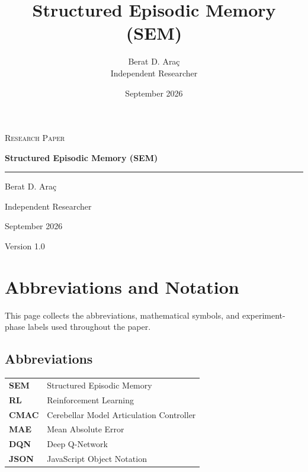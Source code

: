 \documentclass[10pt,twocolumn]{article}
\title{\textbf{Structured Episodic Memory (SEM)}}
\author{Berat D. Ara\c{c}\\Independent Researcher}
\date{September 2026}
\begin{document}
\onecolumn
\hypersetup{pageanchor=false}

\begin{titlepage}
\thispagestyle{empty}
\centering
\vspace*{0.14\textheight}
{\Large\scshape Research Paper\par}
\vspace{1.5cm}
{\Huge\bfseries Structured Episodic Memory (SEM)\par}
\vspace{1.2cm}
\rule{0.68\textwidth}{0.6pt}\par
\vspace{1.4cm}
{\Large Berat D. Ara\c{c}\par}
\vspace{0.25cm}
{\large Independent Researcher\par}
\vfill
{\large September 2026\par}
\vspace{0.25cm}
{\normalsize Version 1.0\par}
\end{titlepage}

\clearpage
\hypersetup{pageanchor=true}
\setcounter{page}{1}
\tableofcontents
\clearpage

\section*{Abbreviations and Notation}
\noindent This page collects the abbreviations, mathematical symbols, and experiment-phase labels used throughout the paper.

\vspace{0.8em}
\subsection*{Abbreviations}
\begin{tabularx}{\textwidth}{@{}>{\bfseries}p{}X@{}}
SEM & Structured Episodic Memory \\
RL & Reinforcement Learning \\
CMAC & Cerebellar Model Articulation Controller \\
MAE & Mean Absolute Error \\
DQN & Deep Q-Network \\
JSON & JavaScript Object Notation \\
\end{tabularx}
\end{document}
